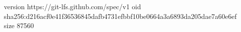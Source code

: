version https://git-lfs.github.com/spec/v1
oid sha256:d216acf0e41f36536845dafb4731efbbf10be0664a3a6893da205dae7a60e6ef
size 87560
